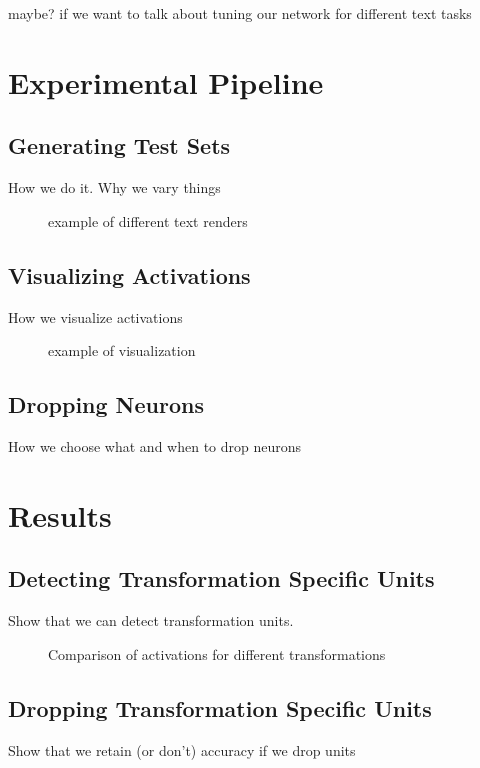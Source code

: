 \documentclass[10pt,twocolumn,letterpaper]{article}
\begin{document}
maybe? if we want to talk about tuning our network for different text tasks

\section{Experimental Pipeline}
\subsection{Generating Test Sets}
How we do it. Why we vary things

\begin{figure}
\caption{example of different text renders}
\label{fig:text}
\end{figure}

\subsection{Visualizing Activations}
How we visualize activations
\begin{figure}
\caption{example of visualization}
\label{fig:vis}
\end{figure}

\subsection{Dropping Neurons}
How we choose what and when to drop neurons

\section{Results}

\subsection{Detecting Transformation Specific Units}
Show that we can detect transformation units.

\begin{figure}
\caption{Comparison of activations for different transformations}
\label{fig:comp}
\end{figure}

\subsection{Dropping Transformation Specific Units}
Show that we retain (or don't) accuracy if we drop units
\end{document}
